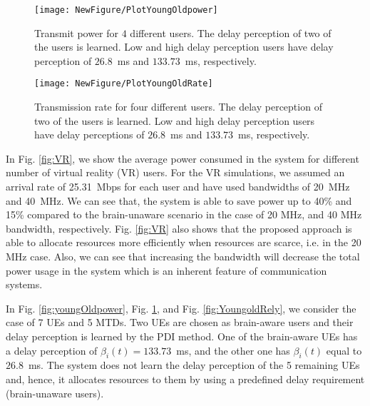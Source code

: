 \documentclass[journal,draftclsnofoot,onecolumn,12pt]{IEEEtran}%
\begin{document}
    
    


	\begin{figure}[!t]
    \begin{minipage}{0.5\textwidth}
		\centering
		\texttt{[image: NewFigure/PlotYoungOldpower]}
		\caption{{Transmit power for $4$ different users. The delay perception of two of the users is learned. Low and high delay perception users have delay perception of $26.8$~ms and $133.73$~ms, respectively.}}
		\label{fig:youngOldpower}
	\end{minipage}
    \begin{minipage}{0.5\textwidth}
		\centering
		\texttt{[image: NewFigure/PlotYoungOldRate]}
		\caption{{Transmission rate for four different users. The delay perception of two of the users is learned. Low and high delay perception users have delay perceptions of $26.8$~ms and $133.73$~ms, respectively.}}
		\label{fig:YoungOldRate}
        \end{minipage}
	\end{figure}


 
{In Fig. \ref{fig:VR}, we show the average power consumed in the system for different number of virtual reality (VR) users. For the VR simulations, we assumed an arrival rate of 25.31~Mbps for each user \cite{Mingzhe2017Globecom} and have used bandwidths of 20~MHz and 40~MHz. We can see that, the system is able to save power up to 40\%  and 15\% compared to the brain-unaware scenario in the case of 20 MHz, and 40 MHz bandwidth, respectively. Fig. \ref{fig:VR} also shows that the proposed approach is able to allocate resources more efficiently when resources are scarce, i.e. in the 20 MHz case. Also, we can see that increasing the bandwidth will decrease the total power usage in the system which is an inherent feature of communication systems.}

	
In Fig. \ref{fig:youngOldpower}, Fig. \ref{fig:YoungOldRate}, and Fig. \ref{fig:YoungoldRely}, we consider the case of 7 UEs and 5 MTDs. Two UEs are chosen as brain-aware users and their delay perception is learned by the PDI method. One of the brain-aware UEs has a delay perception of $\beta_i(t)=133.73$~ms, and the other one has $\beta_i(t)$ equal to $26.8$~ms. The system does not learn the delay perception  of the 5 remaining UEs and, hence, it allocates resources to them by using a predefined delay requirement (brain-unaware users).
\end{document}
